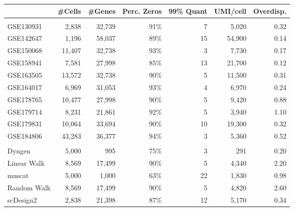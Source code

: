\centering
\begin{tabular}[t]{lrrrrrr}
\toprule
  & \#Cells & \#Genes & Perc.
Zeros & 99\%
Quant & UMI/cell & Overdisp.\\
\midrule
\addlinespace[0mm]
\multicolumn{7}{l}{\textbf{Consistency}}\\
\hspace{1em}GSE130931 & 2,838 & 32,739 & 91\% & 7 & 5,020 & 0.32\\
\hspace{1em}GSE142647 & 1,196 & 58,037 & 89\% & 15 & 54,900 & 0.14\\
\hspace{1em}GSE150068 & 11,407 & 32,738 & 93\% & 3 & 7,730 & 0.17\\
\hspace{1em}GSE158941 & 7,581 & 27,998 & 85\% & 13 & 21,700 & 0.12\\
\hspace{1em}GSE163505 & 13,572 & 32,738 & 90\% & 5 & 11,500 & 0.31\\
\hspace{1em}GSE164017 & 6,969 & 31,053 & 93\% & 4 & 6,970 & 0.24\\
\hspace{1em}GSE178765 & 10,477 & 27,998 & 90\% & 5 & 9,420 & 0.88\\
\hspace{1em}GSE179714 & 8,231 & 21,861 & 92\% & 5 & 3,940 & 1.10\\
\hspace{1em}GSE179831 & 10,064 & 33,694 & 90\% & 10 & 19,300 & 0.32\\
\hspace{1em}GSE184806 & 43,283 & 36,377 & 94\% & 3 & 5,360 & 0.52\\
\addlinespace[3mm]
\multicolumn{7}{l}{\textbf{Simulation}}\\
\hspace{1em}Dyngen & 5,000 & 995 & 75\% & 3 & 291 & 0.20\\
\hspace{1em}Linear Walk & 8,569 & 17,499 & 90\% & 5 & 4,340 & 2.20\\
\hspace{1em}muscat & 5,000 & 1,000 & 63\% & 22 & 1,830 & 0.98\\
\hspace{1em}Random Walk & 8,569 & 17,499 & 90\% & 5 & 4,820 & 2.60\\
\hspace{1em}scDesign2 & 2,838 & 21,398 & 87\% & 12 & 5,170 & 0.34\\

\end{tabular}
